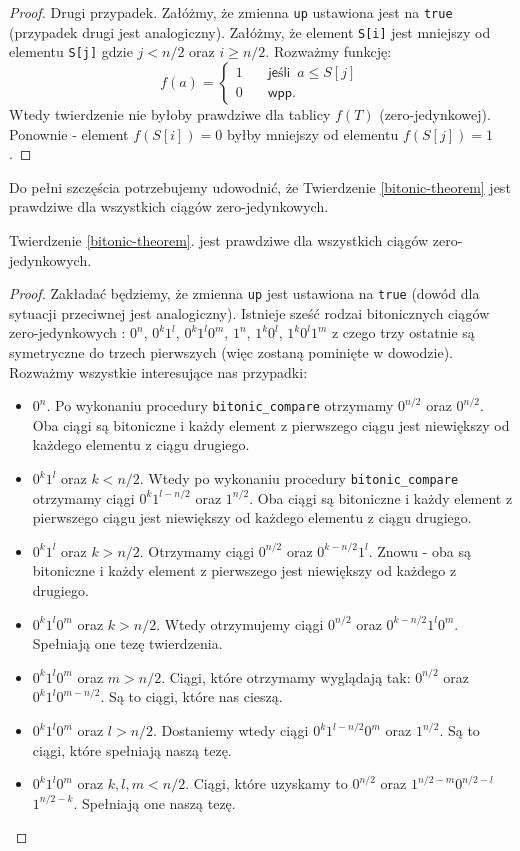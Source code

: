 \begin{proof}
 Drugi przypadek.
 Załóżmy, że zmienna \texttt{up} ustawiona jest na \texttt{true} (przypadek drugi jest analogiczny).
 Załóżmy, że element \texttt{S[i]} jest mniejszy od elementu \texttt{S[j]} gdzie $j < n/2$ oraz $i \geq n/2$.
 Rozważmy funkcję:
  \[   
  f(a) = 
     \begin{cases}
       1 &\quad\textsf{jeśli} \enspace a \leq S[j]\\
       0 &\quad\textsf{wpp.}
     \end{cases}
 \]
 Wtedy twierdzenie nie byłoby prawdziwe dla tablicy $f(T)$ (zero-jedynkowej).
 Ponownie - element $f(S[i]) = 0$ byłby mniejszy od elementu $f(S[j]) = 1$.
\end{proof}

Do pełni szczęścia potrzebujemy udowodnić, że Twierdzenie \ref{bitonic-theorem} jest prawdziwe dla wszystkich ciągów zero-jedynkowych.

\begin{lemma}
 Twierdzenie \ref{bitonic-theorem}. jest prawdziwe dla wszystkich ciągów zero-jedynkowych.
 \label{zero-one-cases-lemma}
\end{lemma}

\begin{proof}
 Zakładać będziemy, że zmienna \texttt{up} jest ustawiona na \texttt{true} (dowód dla sytuacji przeciwnej jest analogiczny).
 Istnieje sześć rodzai bitonicznych ciągów zero-jedynkowych : $0^n$, $0^k1^l$, $0^k1^l0^m$, $1^n$, $1^k0^l$, $1^k0^l1^m$ z czego trzy ostatnie są symetryczne do trzech pierwszych (więc zostaną pominięte w dowodzie).
 Rozważmy wszystkie interesujące nas przypadki:
 \begin{itemize}
  \item $0^n$.
   Po wykonaniu procedury \texttt{bitonic\_compare} otrzymamy $0^{n/2}$ oraz $0^{n/2}$.
   Oba ciągi są bitoniczne i każdy element z pierwszego ciągu jest niewiększy od każdego elementu z ciągu drugiego.
  \item $0^k1^l$ oraz $k < n/2$.
   Wtedy po wykonaniu procedury \texttt{bitonic\_compare} otrzymamy ciągi $0^k1^{l-n/2}$ oraz $1^{n/2}$.
   Oba ciągi są bitoniczne i każdy element z pierwszego ciągu jest niewiększy od każdego elementu z ciągu drugiego.
  \item $0^k1^l$ oraz $k > n/2$.
   Otrzymamy ciągi $0^{n/2}$ oraz $0^{k-n/2}1^l$.
   Znowu - oba są bitoniczne i każdy element z pierwszego jest niewiększy od każdego z drugiego.
  \item $0^k1^l0^m$ oraz $k > n/2$.
   Wtedy otrzymujemy ciągi $0^{n/2}$ oraz $0^{k-n/2}1^l0^m$.
   Spełniają one tezę twierdzenia.
  \item $0^k1^l0^m$ oraz $m > n/2$.
   Ciągi, które otrzymamy wyglądają tak: $0^{n/2}$ oraz $0^k1^l0^{m-n/2}$.
   Są to ciągi, które nas cieszą.
  \item $0^k1^l0^m$ oraz $l > n/2$.
   Dostaniemy wtedy ciągi $0^k1^{l-n/2}0^m$ oraz $1^{n/2}$.
   Są to ciągi, które spełniają naszą tezę.
  \item $0^k1^l0^m$ oraz $k, l, m < n/2$.
   Ciągi, które uzyskamy to $0^{n/2}$ oraz $1^{n/2-m}0^{n/2-l}$ $1^{n/2-k}$.
   Spełniają one naszą tezę.
 \end{itemize}
\end{proof}


